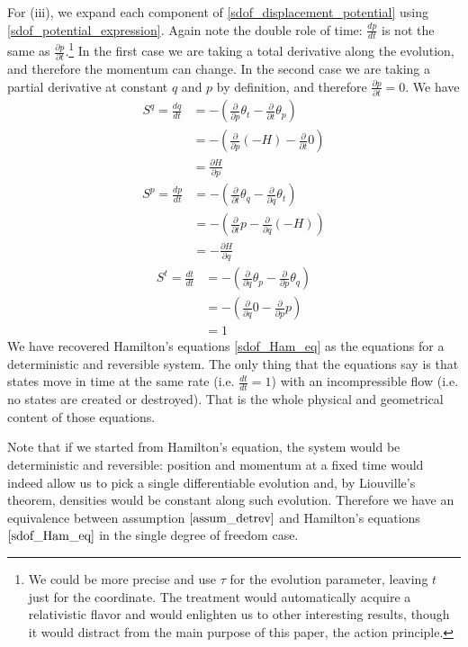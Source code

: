 \documentclass[10pt,twocolumn, nofootinbib]{revtex4-2}
\begin{document}
For (iii), we expand each component of \ref{sdof_displacement_potential} using \ref{sdof_potential_expression}. Again note the double role of time: $\frac{dp}{dt}$ is not the same as $\frac{\partial p}{\partial t}$.\footnote{We could be more precise and use $\tau$ for the evolution parameter, leaving $t$ just for the coordinate. The treatment would automatically acquire a relativistic flavor and would enlighten us to other interesting results, though it would distract from the main purpose of this paper, the action principle. } In the first case we are taking a total derivative along the evolution, and therefore the momentum can change. In the second case we are taking a partial derivative at constant $q$ and $p$ by definition, and therefore $\frac{\partial p}{\partial t}=0$. We have
\begin{align*}
	S^q = \frac{dq}{dt}
	&= - \left( \frac{\partial}{\partial p} \theta_t - \frac{\partial}{\partial t} \theta_p \right) \\
	&= - \left( \frac{\partial}{\partial p} (-H) - \frac{\partial}{\partial t} 0 \right) \\
	& = \frac{\partial H}{\partial p}
\end{align*}
\begin{align*}
	S^p = \frac{dp}{dt}
	&= - \left( \frac{\partial}{\partial t} \theta_q - \frac{\partial}{\partial q} \theta_t \right) \\
	&= - \left( \frac{\partial}{\partial t} p - \frac{\partial}{\partial q} (-H) \right) \\
	& = - \frac{\partial H}{\partial q}
\end{align*}
\begin{align*}
	S^t = \frac{dt}{dt}
	&= - \left( \frac{\partial}{\partial q} \theta_p - \frac{\partial}{\partial p} \theta_q \right) \\
	&= - \left( \frac{\partial}{\partial q} 0 - \frac{\partial}{\partial p} p \right) \\
	& = 1
\end{align*}
We have recovered Hamilton's equations \ref{sdof_Ham_eq} as the equations for a deterministic and reversible system. The only thing that the equations say is that states move in time at the same rate (i.e. $\frac{dt}{dt} = 1$) with an incompressible flow (i.e. no states are created or destroyed). That is the whole physical and geometrical content of those equations.

Note that if we started from Hamilton's equation, the system would be deterministic and reversible: position and momentum at a fixed time would indeed allow us to pick a single differentiable evolution and, by Liouville's theorem, densities would be constant along such evolution. Therefore we have an equivalence between assumption $\ref{assum_detrev}$ and Hamilton's equations $\ref{sdof_Ham_eq}$ in the single degree of freedom case.
\end{document}
